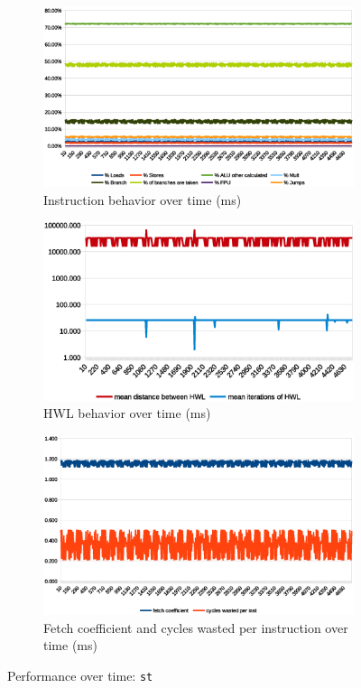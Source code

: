 \documentclass[../bachelor_paper.tex]{subfiles}
\begin{document}
\begin{figure}
    \begin{subfigure}{0.45\textwidth}
        \includegraphics[width=\textwidth]{img/graph/embench/st_inst.eps}
        \caption{Instruction behavior over time (ms)}
    \end{subfigure}
    \begin{subfigure}{0.45\textwidth}
        \includegraphics[width=\textwidth]{img/graph/embench/st_hwl.eps}
        \caption{\ac{HWL} behavior over time (ms)}
    \end{subfigure}
    \begin{subfigure}{0.45\textwidth}
        \includegraphics[width=\textwidth]{img/graph/embench/st_fetch_waste.eps}
        \caption{Fetch coefficient and cycles wasted per instruction over time (ms)}
    \end{subfigure}
    \caption{Performance over time: \texttt{st}}
\end{figure}
\end{document}
